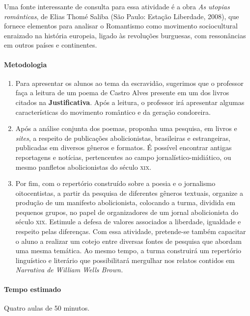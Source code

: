 \documentclass[12pt]{extarticle}
\begin{document}
Uma fonte interessante de consulta para essa atividade é a obra
\emph{As utopias românticas}, de Elias Thomé Saliba (São Paulo: Estação
Liberdade, 2008), que fornece elementos para analisar o Romantismo como
movimento sociocultural enraizado na história europeia, ligado às
revoluções burguesas, com ressonâncias em outros países e continentes.

\paragraph{Metodologia}
   \begin{enumerate}
    \item
    Para apresentar os alunos ao tema da escravidão, sugerimos que o 
    professor faça a leitura de um poema de Castro Alves presente
    em um dos livros citados na \textbf{Justificativa}. Após a leitura,
    o professor irá apresentar algumas características do movimento
    romântico e da geração condoreira.

    \item
    Após a análise conjunta dos poemas, proponha uma pesquisa, em
    livros e \emph{sites}, a respeito de publicações abolicionistas, brasileiras e 
    estrangeiras, publicadas em diversos gêneros e formatos. É possível
  encontrar antigas reportagens e notícias, pertencentes ao campo
  jornalístico-midiático, ou mesmo panfletos abolicionistas do século
  \textsc{xix}.

    \item
    Por fim, com o repertório construído sobre a poesia
  e o jornalismo oitocentistas, a partir da pesquisa de diferentes
  gêneros textuais, organize a produção de um manifesto
  abolicionista, colocando a turma, dividida em pequenos
  grupos, no papel de organizadores de um jornal abolicionista do
  século \textsc{xix}. Estimule a defesa de valores associados a liberdade,
  igualdade e respeito pelas diferenças. Com essa atividade, pretende-se
  também capacitar o aluno a realizar um cotejo entre diversas fontes de
  pesquisa que abordam uma mesma temática. Ao mesmo tempo, a turma
  construirá um repertório linguístico e literário que possibilitará
  mergulhar nos relatos contidos em \emph{Narrativa de William Wells
  Brown.}

   \end{enumerate}
\paragraph{Tempo estimado} Quatro aulas de 50 minutos.
\end{document}
